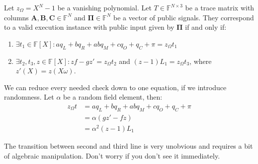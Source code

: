 \documentclass[../lecture-notes.tex]{subfiles}
\begin{document}
\begin{definition}
Let $z_{\Omega} = X^N - 1$ be a vanishing polynomial. Let $T \in \mathbb{F}^{N
\times 3}$ be a trace matrix with columns $\mathbf{A}, \mathbf{B}, \mathbf{C}
\in \mathbb{F}^N$ and $\boldsymbol{\Pi} \in \mathbb{F}^N$ be a vector of public
signals. They correspond to a valid execution instance with public input given
by $\boldsymbol{\Pi}$ if and only if:

\begin{enumerate}
    \item \(\exists t_1 \in \mathbb{F}[X]: aq_L + bq_R + abq_M + cq_O + q_C + \pi = z_{\Omega}t_1\)
    \item \(\exists t_2, t_3, z \in \mathbb{F}[X]: zf - gz' = z_{\Omega}t_2\) and \((z-1)L_1 = z_{\Omega}t_3\), where $z'(X) = z(X\omega)$.
\end{enumerate}
\end{definition}
\begin{remark}
We can reduce every needed check down to one equation, if we introduce randomness.
Let $\alpha$ be a random field element, then: 
\[
    \begin{aligned}
        z_{\Omega}t &= aq_L + bq_R + abq_M + cq_O + q_C + \pi \\
        &= \alpha(gz' - fz) \\
        &= \alpha^2(z - 1)L_1
    \end{aligned}
\]

The transition between second and third line is very unobvious and requires a 
bit of algebraic manipulation. Don't worry if you don't see it immediately.
\end{remark}
\end{document}
